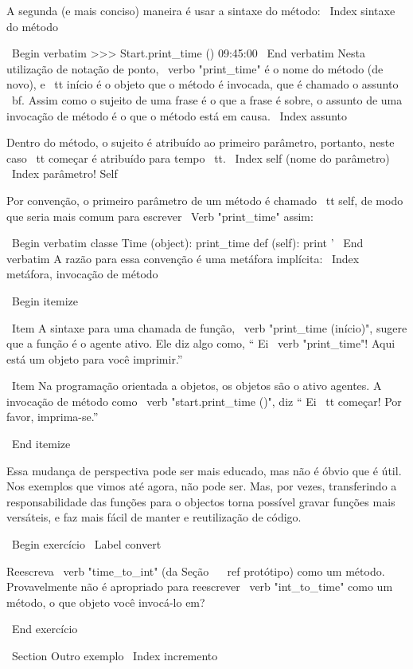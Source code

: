 \documentclass[10pt]{book}
\begin{document}
{{{{{{{{{{{{{{A segunda (e mais conciso) maneira é usar a sintaxe do método:
\ Index {sintaxe do método}

\ Begin {verbatim}
>>> Start.print_time ()
09:45:00
\ End {verbatim}
%
Nesta utilização de notação de ponto, \ verbo "print_time" é o nome do
método (de novo), e {\ tt início} é o objeto que o método é
invocada, que é chamado o assunto {\ bf}. Assim como o
sujeito de uma frase é o que a frase é sobre, o assunto
de uma invocação de método é o que o método está em causa.
\ Index {assunto}

Dentro do método, o sujeito é atribuído ao primeiro
parâmetro, portanto, neste caso {\ tt começar} é atribuído
para {tempo \ tt}.
\ Index {self (nome do parâmetro)}
\ Index {parâmetro! Self}

Por convenção, o primeiro parâmetro de um método é
chamado {\ tt self}, de modo que seria mais comum para escrever
\ Verb "print_time" assim:

\ Begin {verbatim}
classe Time (object):
    print_time def (self):
        print '%
\ End {verbatim}
%
A razão para essa convenção é uma metáfora implícita:
\ Index {metáfora, invocação de método}

\ Begin {itemize}

\ Item A sintaxe para uma chamada de função, \ verb "print_time (início)",
  sugere que a função é o agente ativo. Ele diz algo
  como, `` Ei \ verb "print_time"! Aqui está um objeto para você imprimir.''

\ Item Na programação orientada a objetos, os objetos são o ativo
  agentes. A invocação de método como \ verb "start.print_time ()", diz
  `` Ei {\ tt começar}! Por favor, imprima-se.''

\ End {itemize}

Essa mudança de perspectiva pode ser mais educado, mas não é óbvio
que é útil. Nos exemplos que vimos até agora, não pode
ser. Mas, por vezes, transferindo a responsabilidade das funções para o
objectos torna possível gravar funções mais versáteis, e faz
mais fácil de manter e reutilização de código.

\ Begin {} exercício
\ Label {convert}

Reescreva \ verb "time_to_int" (da Seção ~ \ ref {} protótipo) como um método.
Provavelmente não é apropriado para reescrever \ verb "int_to_time" como um
método, o que objeto você invocá-lo em?

\ End {} exercício


\ Section {Outro exemplo}
\ Index {incremento}

}}}}}}}}}}}}}}
\end{document}
